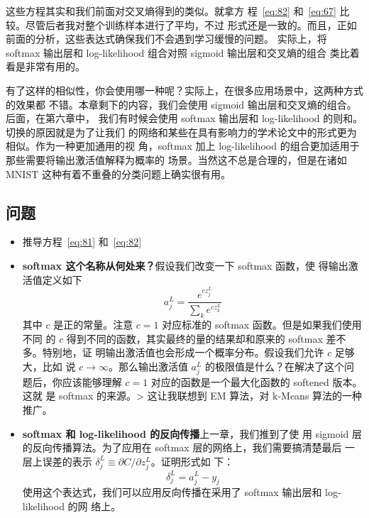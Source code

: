 这些方程其实和我们前面对交叉熵得到的类似。就拿方
程~\eqref{eq:82} 和~\eqref{eq:67} 比较。尽管后者我对整个训练样本进行了平均，不过
形式还是一致的。而且，正如前面的分析，这些表达式确保我们不会遇到学习缓慢的问题。
实际上，将 softmax 输出层和 log-likelihood 组合对照 sigmoid 输出层和交叉熵的组合
类比着看是非常有用的。

有了这样的相似性，你会使用哪一种呢？实际上，在很多应用场景中，这两种方式的效果都
不错。本章剩下的内容，我们会使用 sigmoid 输出层和交叉熵的组合。后面，在第六章中，
我们有时候会使用 softmax 输出层和 log-likelihood 的则和。切换的原因就是为了让我们
的网络和某些在具有影响力的学术论文中的形式更为相似。作为一种更加通用的视
角，softmax 加上 log-likelihood 的组合更加适用于那些需要将输出激活值解释为概率的
场景。当然这不总是合理的，但是在诸如 MNIST 这种有着不重叠的分类问题上确实很有用。

\subsection*{问题}

\begin{itemize}
\item 推导方程~\eqref{eq:81} 和~\eqref{eq:82}
\item \textbf{softmax 这个名称从何处来？}\quad 假设我们改变一下 softmax 函数，使
  得输出激活值定义如下
  \begin{equation}
    a^L_j = \frac{e^{c z^L_j}}{\sum_k e^{c z^L_k}}
    \label{eq:83}\tag{83}
  \end{equation}
  其中 $c$ 是正的常量。注意 $c=1$ 对应标准的 softmax 函数。但是如果我们使用不同
  的 $c$ 得到不同的函数，其实最终的量的结果却和原来的 softmax 差不多。特别地，证
  明输出激活值也会形成一个概率分布。假设我们允许 $c$ 足够大，比如
  说 $c\rightarrow \infty$。那么输出激活值 $a_j^L$ 的极限值是什么？在解决了这个问
  题后，你应该能够理解 $c=1$ 对应的函数是一个最大化函数的 softened 版本。这就
  是 softmax 的来源。> 这让我联想到 EM 算法，对 k-Means 算法的一种推广。
\item \textbf{softmax 和 log-likelihood 的反向传播}\quad 上一章，我们推到了使
  用 sigmoid 层的反向传播算法。为了应用在 softmax 层的网络上，我们需要搞清楚最后
  一层上误差的表示 $\delta^L_j \equiv \partial C / \partial z^L_j$。证明形式如
  下：
  \begin{equation}
    \delta^L_j = a^L_j -y_j
    \label{eq:84}\tag{84}
  \end{equation}
  使用这个表达式，我们可以应用反向传播在采用了 softmax 输出层和 log-likelihood 的网
  络上。
\end{itemize}

